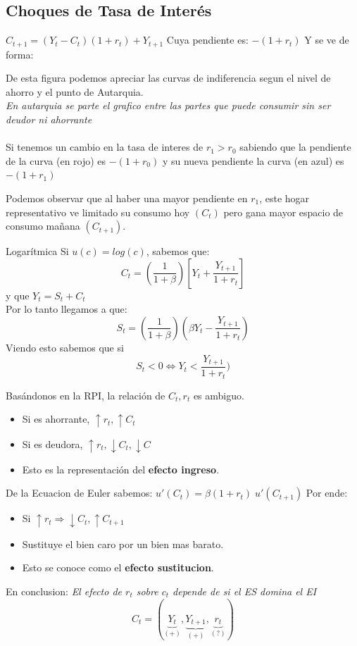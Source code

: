 \documentclass[12pt]{article}
\begin{document}
\subsection{Choques de Tasa de Interés}
$C_{t+1}=(Y_t-C_t)(1+r_t)+Y_{t+1}$
Cuya pendiente es: $-(1+r_t)$
Y se ve de forma: 
\begin{figure} [H]
        \centering 
        
        \label{fig:placeholder}
\end{figure}
De esta figura podemos apreciar las curvas de indiferencia segun el nivel de ahorro y el punto de Autarquia. \\
\textit{En autarquia se parte el grafico entre las partes que puede consumir sin ser deudor ni ahorrante}\\\\
Si tenemos un cambio en la tasa de interes de $r_1>r_0$ sabiendo que la pendiente de la curva (en rojo) es $-(1+r_0)$ y su nueva pendiente la curva (en azul) es $-(1+r_1)$
\begin{figure} [H]
        \centering 
        
        \label{fig:placeholder}
\end{figure}
Podemos observar que al haber una mayor pendiente en $r_1$, este hogar representativo ve limitado su consumo hoy $(C_t)$ pero gana mayor espacio de consumo mañana $(C_{t+1})$. 
\begin{ejemplo}{Logarítmica}
    Si $u(c)=log(c)$, sabemos que: 
    $$C_t=(\frac{1}{1+\beta})[Y_t+\frac{Y_{t+1}}{1+r_t}]$$
    y que $Y_t=S_t+C_t$ \\
    Por lo tanto llegamos a que: 
    $$S_t=(\frac{1}{1+\beta})(\beta Y_t-\frac{Y_{t+1}}{1+r_t})$$
    Viendo esto sabemos que si $$S_t<0 \iff Y_t<\frac{Y_{t+1}}{1+r_t})$$
\end{ejemplo}

Basándonos en la RPI, la relación de $C_t, r_t$ es ambiguo. 
\begin{itemize}
    \item Si es ahorrante, $\uparrow r_t, \uparrow C_t$
    \item Si es deudora, $\uparrow r_t, \downarrow C_t,\downarrow C_{}$
    \item Esto es la representación del \textbf{efecto ingreso}. 
\end{itemize}
De la Ecuacion de Euler sabemos: 
$u'(C_t)=\beta (1+r_t)\; u'(C_{t+1})$
Por ende: 
\begin{itemize}
    \item Si $\uparrow r_t\Rightarrow{} \downarrow C_t, \uparrow C_{t+1}$
    \item Sustituye el bien caro por un bien mas barato. 
    \item Esto se conoce como el \textbf{efecto sustitucion}.
\end{itemize}
En conclusion: \textit{El efecto de $r_t$ sobre $c_t$ depende de si el ES domina el EI}
$$C_t=(\underbrace{Y_t}_{(+)},\underbrace{Y_{t+1}}_{(+)},\underbrace{r_t}_{(?)} )$$
\end{document}
